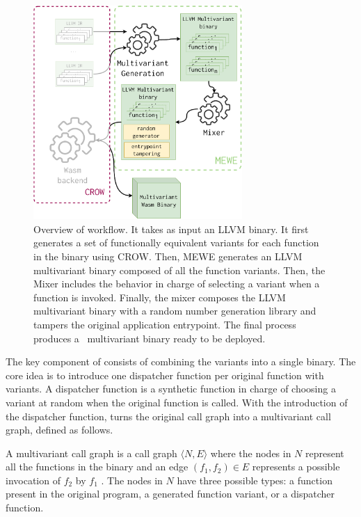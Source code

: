 \begin{figure}
  \centering
  \includegraphics[height=3.2in]{diagrams/MEWE.pdf}
  \caption{Overview of \tool workflow. It takes as input an LLVM binary. It first generates a set of functionally equivalent variants for each function in the binary using CROW. Then, MEWE generates an LLVM multivariant binary composed of all the function variants. Then, the Mixer includes the behavior in charge of selecting a variant when a function is invoked. Finally, the \tool mixer composes the LLVM multivariant binary with a random number generation library and tampers the original application entrypoint. The final process produces a \wasm\ multivariant binary ready to be deployed. }
  \label{workflow}
\end{figure}


The key component of \tool consists of combining the variants into a single binary.
The core idea is to introduce one dispatcher function per original function with variants.
A dispatcher function is a synthetic function in charge of choosing a variant at random when the original function is called.
With the introduction of the dispatcher function,  \tool turns the original call graph into a multivariant call graph, defined as follows. 


\begin{definition}\label{def:EP}
  A multivariant call graph is a call graph $\langle N, E \rangle$ where the nodes in $N$ represent all the functions in the binary and an edge $(f_1,f_2) \in E$ represents a possible invocation of $f_2$ by $f_1$  \cite{ryder1979}. The nodes in $N$ have three possible types: a function present in the original program,  a generated function variant, or a dispatcher function.
\end{definition}


